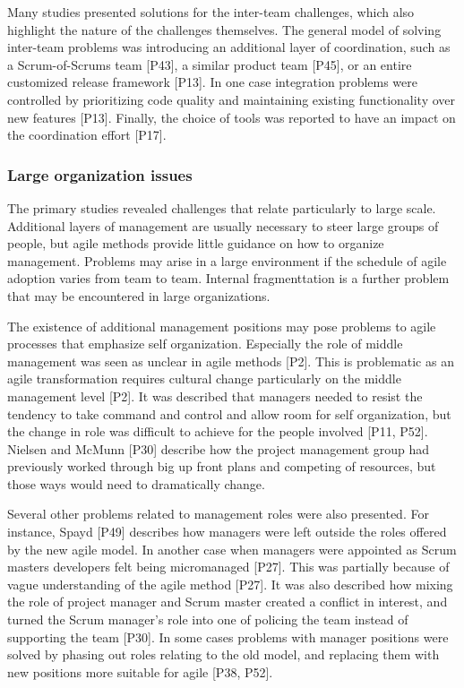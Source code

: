 \documentclass[preprint,authoryear,12pt]{elsarticle}
\begin{document}
Many studies presented solutions for the inter-team challenges, which also
highlight the nature of the challenges themselves. The general model of solving
inter-team problems was introducing an additional layer of coordination, such as
a Scrum-of-Scrums team [P43], a similar product team [P45], or an entire
customized release framework [P13]. In one case integration problems were
controlled by prioritizing code quality and maintaining existing functionality
over new features [P13]. Finally, the choice of tools was reported to have an
impact on the coordination effort [P17].



\subsubsection{Large organization issues}

The primary studies revealed challenges that relate particularly to large
scale. Additional layers of management are usually necessary to steer large
groups of people, but agile methods provide little guidance on how to organize
management. Problems may arise in a large environment if the schedule of agile
adoption varies from team to team. Internal fragmenttation is a further problem
that may be encountered in large organizations.


The existence of additional management positions may pose problems to agile
processes that emphasize self organization.
Especially the role of middle management was seen as unclear in agile methods
[P2]. This is problematic as an agile transformation requires cultural change
particularly on the middle management level [P2].
It was described that managers needed to resist the tendency to take command and
control and allow room for self organization, but the change in role was
difficult to achieve for the people involved [P11, P52].
Nielsen and McMunn [P30] describe how the project management group had
previously worked through big up front plans and competing of resources, but
those ways would need to dramatically change.

Several other problems related to management roles were also presented. For
instance, Spayd [P49] describes how managers were left outside the roles offered
by the new agile model. In another case when managers were appointed as Scrum
masters developers felt being micromanaged [P27]. This was partially because of
vague understanding of the agile method [P27]. It was also described how mixing
the role of project manager and Scrum master created a conflict in interest, and
turned the Scrum manager's role into one of policing the team instead of
supporting the team [P30]. In some cases problems with manager positions were
solved by phasing out roles relating to the old model, and replacing them with
new positions more suitable for agile [P38, P52].
\end{document}
